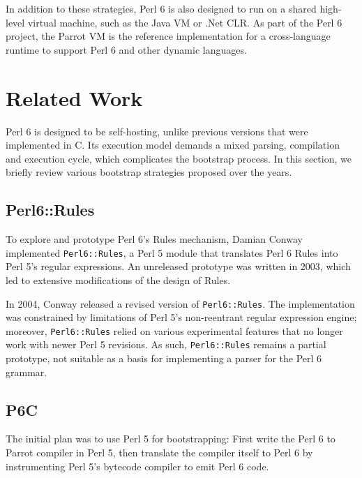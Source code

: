\documentclass[]{sigplanconf}
\begin{document}
In addition to these strategies, Perl 6 is also designed to run on a shared
high-level virtual machine, such as the Java VM or .Net CLR.  As part of the
Perl 6 project, the Parrot VM is the reference implementation for a
cross-language runtime to support Perl 6 and other dynamic languages.

\section{Related Work}
\label{sec:RelatedWork}

Perl 6 is designed to be self-hosting, unlike previous versions that were
implemented in C.  Its execution model demands a mixed parsing, compilation and
execution cycle, which complicates the bootstrap process.  In this section, we
briefly review various bootstrap strategies proposed over the years.

\subsection{Perl6::Rules}
\label{sec:Perl6Rules}

To explore and prototype Perl 6's Rules mechanism, Damian Conway implemented
\texttt{Perl6::Rules}, a Perl 5 module that translates Perl 6 Rules into Perl 5's
regular expressions.  An unreleased prototype was written in 2003, which led to
extensive modifications of the design of Rules.

In 2004, Conway released a revised version of \texttt{Perl6::Rules}.  The
implementation was constrained by limitations of Perl 5's non-reentrant regular
expression engine; moreover, \texttt{Perl6::Rules} relied on various
experimental features that no longer work with newer Perl 5 revisions.  As
such, \texttt{Perl6::Rules} remains a partial prototype, not suitable as a
basis for implementing a parser for the Perl 6 grammar.

\subsection{P6C}
\label{sec:P6C}

The initial plan was to use Perl 5 for bootstrapping: First write the Perl 6 to
Parrot compiler in Perl 5, then translate the compiler itself to Perl 6 by
instrumenting Perl 5's bytecode compiler to emit Perl 6 code.
\end{document}
